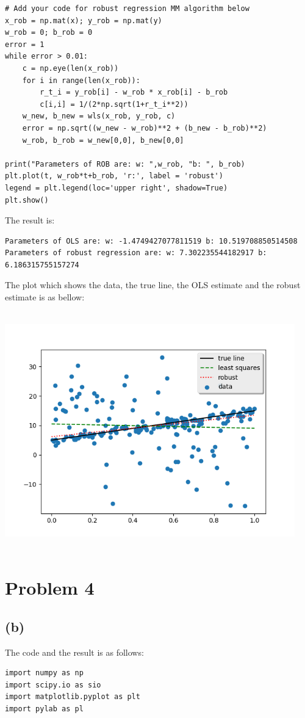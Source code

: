 \documentclass[letterpaper,11pt]{article}
\begin{document}
\begin{spacing}{1.2}
\begin{lstlisting}
# Add your code for robust regression MM algorithm below
x_rob = np.mat(x); y_rob = np.mat(y)
w_rob = 0; b_rob = 0
error = 1
while error > 0.01:
    c = np.eye(len(x_rob))
    for i in range(len(x_rob)):
        r_t_i = y_rob[i] - w_rob * x_rob[i] - b_rob
        c[i,i] = 1/(2*np.sqrt(1+r_t_i**2))
    w_new, b_new = wls(x_rob, y_rob, c)
    error = np.sqrt((w_new - w_rob)**2 + (b_new - b_rob)**2)
    w_rob, b_rob = w_new[0,0], b_new[0,0]

print("Parameters of ROB are: w: ",w_rob, "b: ", b_rob)
plt.plot(t, w_rob*t+b_rob, 'r:', label = 'robust')
legend = plt.legend(loc='upper right', shadow=True)
plt.show()
\end{lstlisting}
The result is:
\begin{lstlisting}
Parameters of OLS are: w: -1.4749427077811519 b: 10.519708850514508
Parameters of robust regression are: w: 7.302235544182917 b: 6.186315755157274
\end{lstlisting}
The plot which shows the data, the true line, the OLS estimate and the robust estimate is as bellow:

\includegraphics[width=4.95in,height=4.05in]{Robust_Regression.png}

\section*{Problem 4}
\subsection*{(b)}
The code and the result is as follows:
\begin{lstlisting}
import numpy as np
import scipy.io as sio
import matplotlib.pyplot as plt
import pylab as pl


\end{lstlisting}
\end{spacing}
\end{document}
